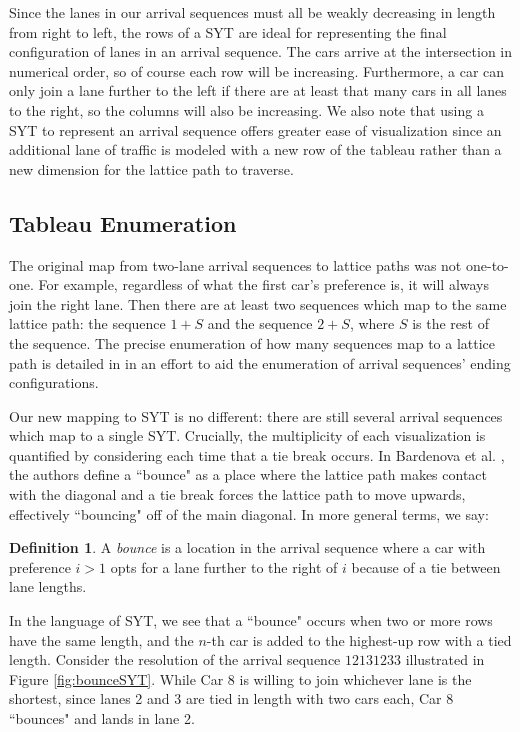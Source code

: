 \documentclass[article]{amsart}
\theoremstyle{plain}
\theoremstyle{definition}
\newtheorem{definition}{Definition}
\begin{document}
Since the lanes in our arrival sequences must all be weakly decreasing in length from right to left, the rows of a SYT are ideal for representing the final configuration of lanes in an arrival sequence. The cars arrive at the intersection in numerical order, so of course each row will be increasing. Furthermore, a car can only join a lane further to the left if there are at least that many cars in all lanes to the right, so the columns will also be increasing. We also note that using a SYT to represent an arrival sequence offers greater ease of visualization since an additional lane of traffic is modeled with a new row of the tableau rather than a new dimension for the lattice path to traverse.

\subsection{Tableau Enumeration} \label{sub:syt_enumer}
The original map from two-lane arrival sequences to lattice paths was not one-to-one. For example, regardless of what the first car's preference is, it will always join the right lane. Then there are at least two sequences which map to the same lattice path: the sequence $1 + S$ and the sequence $2 + S$, where $S$ is the rest of the sequence. The precise enumeration of how many sequences map to a lattice path is detailed in \cite{bard} in an effort to aid the enumeration of arrival sequences' ending configurations. 

Our new mapping to SYT is no different: there are still several arrival sequences which map to a single SYT. Crucially, the multiplicity of each visualization is quantified by considering each time that a tie break occurs. In Bardenova et al. \cite{bard}, the authors define a ``bounce" as a place where the lattice path makes contact with the diagonal and a tie break forces the lattice path to move upwards, effectively ``bouncing" off of the main diagonal. In more general terms, we say:

\begin{definition}
    A \textit{bounce} is a location in the arrival sequence where a car with preference $i > 1$ opts for a lane further to the right of $i$ because of a tie between lane lengths. 
\end{definition}

In the language of SYT, we see that a ``bounce" occurs when two or more rows have the same length, and the $n$-th car is added to the highest-up row with a tied length. Consider the resolution of the arrival sequence $12131233$ illustrated in Figure \ref{fig:bounceSYT}. While Car 8 is willing to join whichever lane is the shortest, since lanes 2 and 3 are tied in length with two cars each, Car 8 ``bounces" and lands in lane 2.
\end{document}
